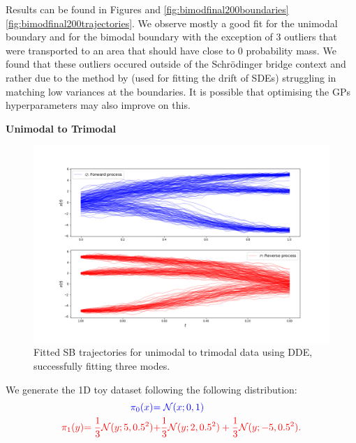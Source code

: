 \documentclass[a4paper,12pt,twoside,openright]{report}
\theoremstyle{definition}
\begin{document}
Results can be found in Figures and \ref{fig:bimodfinal200boundaries} \ref{fig:bimodfinal200trajectories}. We observe mostly a good fit for the unimodal boundary and for the bimodal boundary with the exception of 3 outliers that were transported to an area that should have close to 0 probability mass.  
We found that these outliers occured outside of the Schrödinger bridge context and rather due to the method by \cite{ruttor2013approximate} (used for fitting the drift of SDEs) struggling in matching low variances at the boundaries. It is possible that optimising the GPs hyperparameters may also improve on this. 

\textbf{Unimodal to Trimodal}\\
\begin{figure}[t]
    \centering
    \includegraphics[scale=0.4,trim={2.3cm 1cm 2.5cm 0}, clip]{images/GP/gp_3_mode_200_trimodal_boundaires_trajectories.png}
    \caption{ Fitted SB trajectories for unimodal to trimodal data using DDE, successfully fitting three modes.  }
    \label{fig:3mode1d200trajectroies}
\end{figure}
We generate the 1D toy dataset following the following distribution:
\begin{align*}
     \color{blue}{\pi_0(x)} &\color{blue}{= {\mathcal{N}}(x; 0,  1)} \\
    \color{red}{\pi_1(y)} \color{red}{= \frac{1}{3}{\mathcal{N}}(y; 5, 0.5 ^2)}&\color{red}{ + \frac{1}{3}{\mathcal{N}}(y; 2, 0.5 ^2) + \frac{1}{3}{\mathcal{N}}(y; -5, 0.5 ^2)}.
\end{align*}
\end{document}
